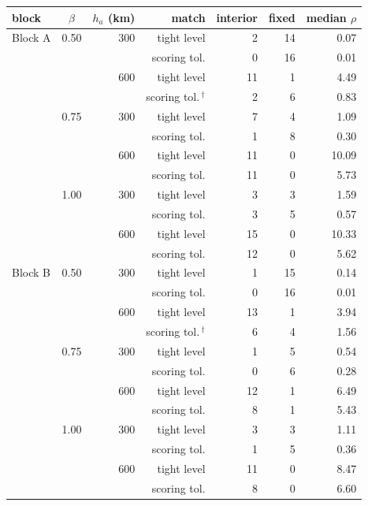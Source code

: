 \begin{tabular}{@{}l c r r r r r@{}}
\toprule
block & $\beta$ & $h_a$ (km) & match & interior & fixed & median $\rho$ \\
\midrule
Block A & 0.50 & 300 & tight level & 2 & 14 & 0.07 \\
 &  &  & scoring tol. & 0 & 16 & 0.01 \\
 &  & 600 & tight level & 11 & 1 & 4.49 \\
 &  &  & scoring tol.\,$^{\dagger}$ & 2 & 6 & 0.83 \\
 & 0.75 & 300 & tight level & 7 & 4 & 1.09 \\
 &  &  & scoring tol. & 1 & 8 & 0.30 \\
 &  & 600 & tight level & 11 & 0 & 10.09 \\
 &  &  & scoring tol. & 11 & 0 & 5.73 \\
 & 1.00 & 300 & tight level & 3 & 3 & 1.59 \\
 &  &  & scoring tol. & 3 & 5 & 0.57 \\
 &  & 600 & tight level & 15 & 0 & 10.33 \\
 &  &  & scoring tol. & 12 & 0 & 5.62 \\
\midrule
Block B & 0.50 & 300 & tight level & 1 & 15 & 0.14 \\
 &  &  & scoring tol. & 0 & 16 & 0.01 \\
 &  & 600 & tight level & 13 & 1 & 3.94 \\
 &  &  & scoring tol.\,$^{\dagger}$ & 6 & 4 & 1.56 \\
 & 0.75 & 300 & tight level & 1 & 5 & 0.54 \\
 &  &  & scoring tol. & 0 & 6 & 0.28 \\
 &  & 600 & tight level & 12 & 1 & 6.49 \\
 &  &  & scoring tol. & 8 & 1 & 5.43 \\
 & 1.00 & 300 & tight level & 3 & 3 & 1.11 \\
 &  &  & scoring tol. & 1 & 5 & 0.36 \\
 &  & 600 & tight level & 11 & 0 & 8.47 \\
 &  &  & scoring tol. & 8 & 0 & 6.60 \\
\bottomrule
\end{tabular}
